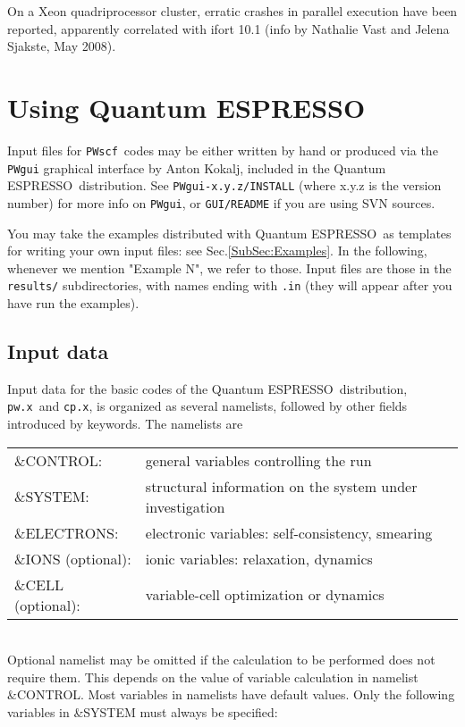 \documentclass[12pt,a4paper]{article}
\def\qe{{\sc Quantum ESPRESSO}}
\def\pwx{\texttt{pw.x}}
\def\cpx{\texttt{cp.x}}
\def\PWscf{\texttt{PWscf}}
\begin{document}
On a Xeon quadriprocessor cluster, erratic crashes in parallel
execution have been reported, apparently correlated with ifort 10.1
(info by Nathalie Vast and Jelena Sjakste, May 2008).
\newpage

\section{Using \qe}

Input files for \PWscf\ codes may be either written by hand 
or produced via the \texttt{PWgui} graphical interface by Anton Kokalj, 
included in the \qe\ distribution. See \texttt{PWgui-x.y.z/INSTALL}
(where x.y.z is the version number) for more info on \texttt{PWgui}, 
or \texttt{GUI/README} if you are using SVN sources.
    
You may take the examples distributed with \qe\ as
templates for writing your own input files: see Sec.\ref{SubSec:Examples}.
In the following, whenever we mention "Example N", we refer to those. 
Input files are those in the \texttt{results/} subdirectories, with names ending
with \texttt{.in} 
(they will appear after you have run the examples).
    

\subsection{Input data}

Input data for the basic codes of the \qe\ distribution, \pwx\ and \cpx,
is organized as several namelists, followed by other fields
introduced by keywords. The namelists are

\begin{tabular}{ll}
      \&CONTROL:& general variables controlling the run\\
      \&SYSTEM: &structural information on the system under investigation\\
      \&ELECTRONS: &electronic variables: self-consistency, smearing\\
      \&IONS (optional): &ionic variables: relaxation, dynamics\\
      \&CELL (optional): &variable-cell optimization or dynamics\\
\end{tabular}    \\
Optional namelist may be omitted if the calculation to be performed
does not require them. This depends on the value of variable calculation
in namelist \&CONTROL. Most variables in namelists have default values. Only
the following variables in \&SYSTEM must always be specified:
\end{document}
